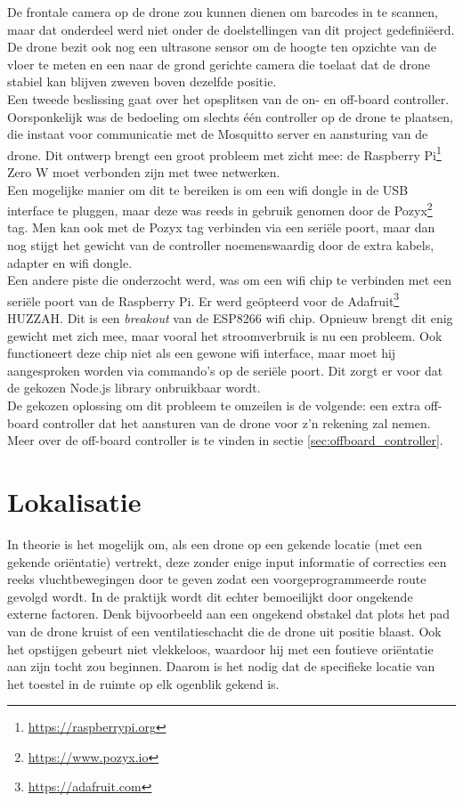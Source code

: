 De frontale camera op de drone zou kunnen dienen om barcodes in te scannen, maar dat onderdeel werd niet onder de doelstellingen van dit project gedefiniëerd.
De drone bezit ook nog een ultrasone sensor om de hoogte ten opzichte van de vloer te meten en een naar de grond gerichte camera die toelaat dat de drone stabiel kan blijven zweven boven dezelfde positie.\\

Een tweede beslissing gaat over het opsplitsen van de on- en off-board controller.
Oorsponkelijk was de bedoeling om slechts één controller op de drone te plaatsen, die instaat voor communicatie met de Mosquitto server en aansturing van de drone.
Dit ontwerp brengt een groot probleem met zicht mee: de Raspberry Pi\footnote{\url{https://raspberrypi.org}} Zero W moet verbonden zijn met twee netwerken.\\
Een mogelijke manier om dit te bereiken is om een wifi dongle in de USB interface te pluggen, maar deze was reeds in gebruik genomen door de Pozyx\footnote{\url{https://www.pozyx.io}} tag.
Men kan ook met de Pozyx tag verbinden via een seriële poort, maar dan nog stijgt het gewicht van de controller noemenswaardig door de extra kabels, adapter en wifi dongle.\\
Een andere piste die onderzocht werd, was om een wifi chip te verbinden met een seriële poort van de Raspberry Pi.
Er werd geöpteerd voor de Adafruit\footnote{\url{https://adafruit.com}} HUZZAH.
Dit is een \textit{breakout} van de ESP8266 wifi chip.
Opnieuw brengt dit enig gewicht met zich mee, maar vooral het stroomverbruik is nu een probleem.
Ook functioneert deze chip niet als een gewone wifi interface, maar moet hij aangesproken worden via commando's op de seriële poort.
Dit zorgt er voor dat de gekozen Node.js library onbruikbaar wordt.\\
De gekozen oplossing om dit probleem te omzeilen is de volgende: een extra off-board controller dat het aansturen van de drone voor z'n rekening zal nemen.
Meer over de off-board controller is te vinden in sectie \ref{sec:offboard_controller}.

\section{Lokalisatie} \label{sec:localization}
In theorie is het mogelijk om, als een drone op een gekende locatie (met een gekende ori\"entatie) vertrekt, deze zonder enige input informatie of correcties een reeks vluchtbewegingen door te geven zodat een voorgeprogrammeerde route gevolgd wordt.
In de praktijk wordt dit echter bemoeilijkt door ongekende externe factoren. Denk bijvoorbeeld aan een ongekend obstakel dat plots het pad van de drone kruist of een ventilatieschacht die de drone uit positie blaast.
Ook het opstijgen gebeurt niet vlekkeloos, waardoor hij met een foutieve ori\"entatie aan zijn tocht zou beginnen.
Daarom is het nodig dat de specifieke locatie van het toestel in de ruimte op elk ogenblik gekend is.\\

